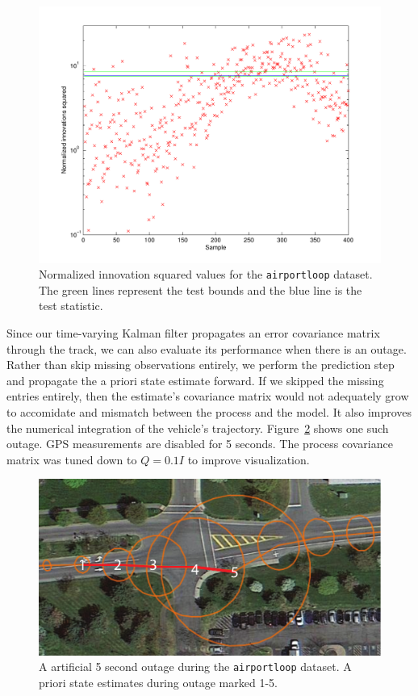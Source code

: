 \begin{figure}
\includegraphics[width=\columnwidth]{nis}
\caption{Normalized innovation squared values for the \texttt{airportloop} dataset.  The green lines represent the test bounds and the blue line is the test statistic.}
\label{fig:nis}
\end{figure}

Since our time-varying Kalman filter propagates an error covariance matrix through the track, we can also evaluate its performance when there is an outage.  Rather than skip missing observations entirely, we perform the prediction step and propagate the a priori state estimate forward.  If we skipped the missing entries entirely, then the estimate's covariance matrix would not adequately grow to accomidate and mismatch between the process and the model.  It also improves the numerical integration of the vehicle's trajectory.  Figure~\ref{fig:outage} shows one such outage.  GPS measurements are disabled for 5 seconds.  The process covariance matrix was tuned down to $Q = 0.1I$ to improve visualization.

\begin{figure}
\includegraphics[width=\columnwidth]{outage}
\caption{A artificial 5 second outage during the \texttt{airportloop} dataset.  A priori state estimates during outage marked 1-5.}
\label{fig:outage}
\end{figure}

